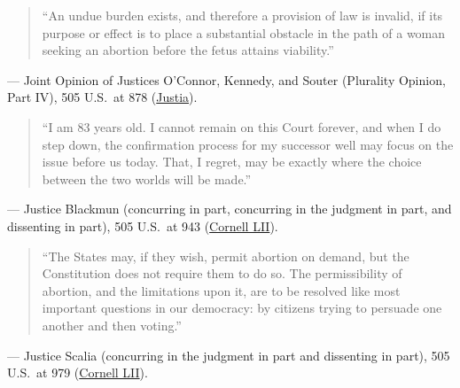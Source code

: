 \documentclass[12pt]{article}
\begin{document}
\begin{quote}
``An undue burden exists, and therefore a provision of law is invalid, if its purpose or effect is to place a substantial obstacle in the path of a woman seeking an abortion before the fetus attains viability.''
\end{quote}
\noindent --- Joint Opinion of Justices O'Connor, Kennedy, and Souter (Plurality Opinion, Part IV), 505 U.S.\ at 878 (\href{https://supreme.justia.com/cases/federal/us/505/833/}{Justia}).

\begin{quote}
``I am 83 years old. I cannot remain on this Court forever, and when I do step down, the confirmation process for my successor well may focus on the issue before us today. That, I regret, may be exactly where the choice between the two worlds will be made.''
\end{quote}
\noindent --- Justice Blackmun (concurring in part, concurring in the judgment in part, and dissenting in part), 505 U.S.\ at 943 (\href{https://www.law.cornell.edu/supct/html/91-744.ZX2.html}{Cornell LII}).

\begin{quote}
``The States may, if they wish, permit abortion on demand, but the Constitution does not require them to do so. The permissibility of abortion, and the limitations upon it, are to be resolved like most important questions in our democracy: by citizens trying to persuade one another and then voting.''
\end{quote}
\noindent --- Justice Scalia (concurring in the judgment in part and dissenting in part), 505 U.S.\ at 979 (\href{https://www.law.cornell.edu/supct/html/91-744.ZX4.html}{Cornell LII}).
\end{document}
